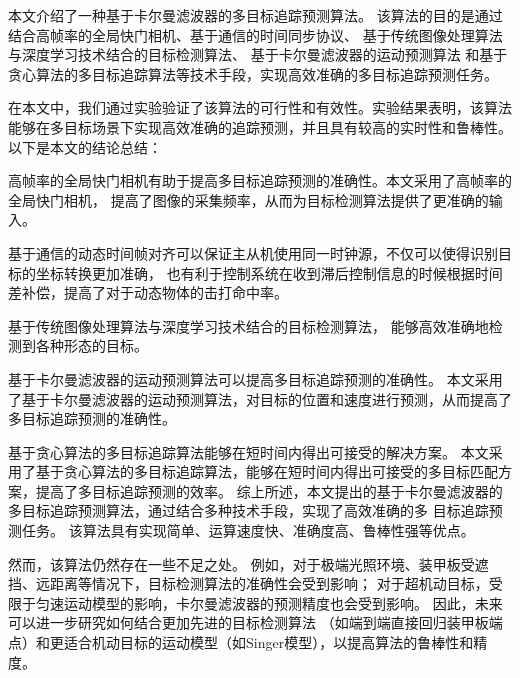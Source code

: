 


\begin{conclusions}

本文介绍了一种基于卡尔曼滤波器的多目标追踪预测算法。
该算法的目的是通过结合高帧率的全局快门相机、基于通信的时间同步协议、
基于传统图像处理算法与深度学习技术结合的目标检测算法、
基于卡尔曼滤波器的运动预测算法
和基于贪心算法的多目标追踪算法等技术手段，实现高效准确的多目标追踪预测任务。

在本文中，我们通过实验验证了该算法的可行性和有效性。实验结果表明，该算法能够在多目标场景下实现高效准确的追踪预测，并且具有较高的实时性和鲁棒性。以下是本文的结论总结：

高帧率的全局快门相机有助于提高多目标追踪预测的准确性。本文采用了高帧率的全局快门相机，
提高了图像的采集频率，从而为目标检测算法提供了更准确的输入。

基于通信的动态时间帧对齐可以保证主从机使用同一时钟源，不仅可以使得识别目标的坐标转换更加准确，
也有利于控制系统在收到滞后控制信息的时候根据时间差补偿，提高了对于动态物体的击打命中率。

基于传统图像处理算法与深度学习技术结合的目标检测算法，
能够高效准确地检测到各种形态的目标。

基于卡尔曼滤波器的运动预测算法可以提高多目标追踪预测的准确性。
本文采用了基于卡尔曼滤波器的运动预测算法，对目标的位置和速度进行预测，从而提高了多目标追踪预测的准确性。

基于贪心算法的多目标追踪算法能够在短时间内得出可接受的解决方案。
本文采用了基于贪心算法的多目标追踪算法，能够在短时间内得出可接受的多目标匹配方案，提高了多目标追踪预测的效率。
综上所述，本文提出的基于卡尔曼滤波器的多目标追踪预测算法，通过结合多种技术手段，实现了高效准确的多
目标追踪预测任务。
该算法具有实现简单、运算速度快、准确度高、鲁棒性强等优点。

然而，该算法仍然存在一些不足之处。
例如，对于极端光照环境、装甲板受遮挡、远距离等情况下，目标检测算法的准确性会受到影响；
对于超机动目标，受限于匀速运动模型的影响，卡尔曼滤波器的预测精度也会受到影响。
因此，未来可以进一步研究如何结合更加先进的目标检测算法
（如端到端直接回归装甲板端点）和更适合机动目标的运动模型（如Singer\cite{jia2017highly}模型），以提高算法的鲁棒性和精度。



\end{conclusions}
